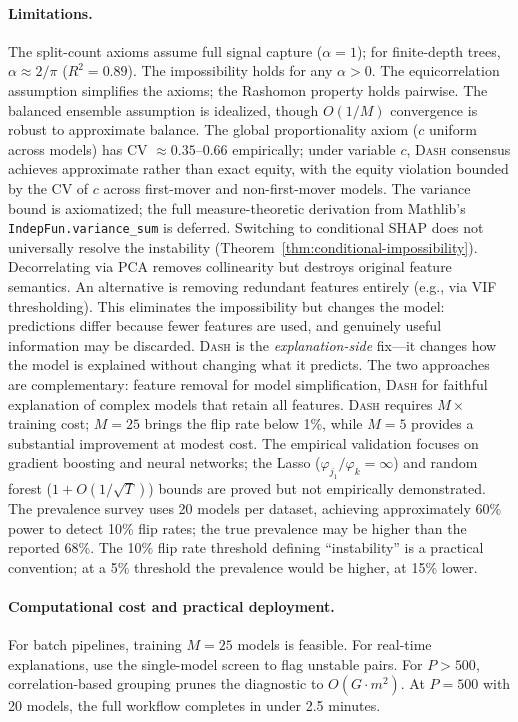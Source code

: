 \documentclass{article}
\newcommand{\DASH}{\textsc{Dash}}
\begin{document}
\paragraph{Limitations.}
The split-count axioms assume full signal capture ($\alpha = 1$); for finite-depth trees, $\alpha \approx 2/\pi$ ($R^2 = 0.89$). The impossibility holds for any $\alpha > 0$.
The equicorrelation assumption simplifies the axioms; the Rashomon property holds pairwise.
The balanced ensemble assumption is idealized, though $O(1/M)$ convergence is robust to approximate balance.
The global proportionality axiom ($c$ uniform across models) has CV $\approx 0.35$--$0.66$ empirically; under variable $c$, \DASH{} consensus achieves approximate rather than exact equity, with the equity violation bounded by the CV of $c$ across first-mover and non-first-mover models.
The variance bound is axiomatized; the full measure-theoretic derivation from Mathlib's \texttt{IndepFun.variance\_sum} is deferred.
Switching to conditional SHAP does not universally resolve the instability (Theorem~\ref{thm:conditional-impossibility}).
Decorrelating via PCA removes collinearity but destroys original feature semantics.
An alternative is removing redundant features entirely (e.g., via VIF thresholding). This eliminates the impossibility but changes the model: predictions differ because fewer features are used, and genuinely useful information may be discarded. \DASH{} is the \emph{explanation-side} fix---it changes how the model is explained without changing what it predicts. The two approaches are complementary: feature removal for model simplification, \DASH{} for faithful explanation of complex models that retain all features.
\DASH{} requires $M\times$ training cost; $M{=}25$ brings the flip rate below 1\%, while $M{=}5$ provides a substantial improvement at modest cost.
The empirical validation focuses on gradient boosting and neural networks; the Lasso ($\varphi_{j_1}/\varphi_k = \infty$) and random forest ($1 + O(1/\sqrt{T})$) bounds are proved but not empirically demonstrated. The prevalence survey uses 20 models per dataset, achieving approximately 60\% power to detect 10\% flip rates; the true prevalence may be higher than the reported 68\%.
The 10\% flip rate threshold defining ``instability'' is a practical convention; at a 5\% threshold the prevalence would be higher, at 15\% lower.

\paragraph{Computational cost and practical deployment.}
For batch pipelines, training $M{=}25$ models is feasible. For real-time explanations, use the single-model screen to flag unstable pairs. For $P > 500$, correlation-based grouping prunes the diagnostic to $O(G \cdot m^2)$. At $P{=}500$ with 20 models, the full workflow completes in under 2.5 minutes.
\end{document}
